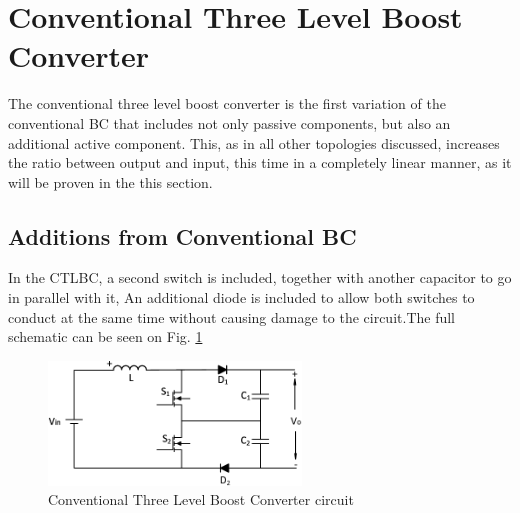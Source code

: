 \section{Conventional Three Level Boost Converter}\label{ch:TLBC}

The conventional three level boost converter is the first variation of the conventional BC that includes not only passive components, but also an additional active component. This, as in all other topologies discussed, increases the ratio between output and input, this time in a completely linear manner, as it will be proven in the this section. 

\subsection{Additions from Conventional BC}
In the CTLBC, a second switch is included, together with another capacitor to go in parallel with it, An additional diode is included to allow both switches to conduct at the same time without causing damage to the circuit.The full schematic can be seen on Fig. \ref{fig:CTLBC}  

\begin{figure} [H]
   \centering
   \includegraphics[width=0.6\textwidth]{figures/dConventionalThreeLevelBC/Three_level.pdf}
    \caption{Conventional Three Level Boost Converter circuit}
	\label{fig:CTLBC}
\end{figure}
